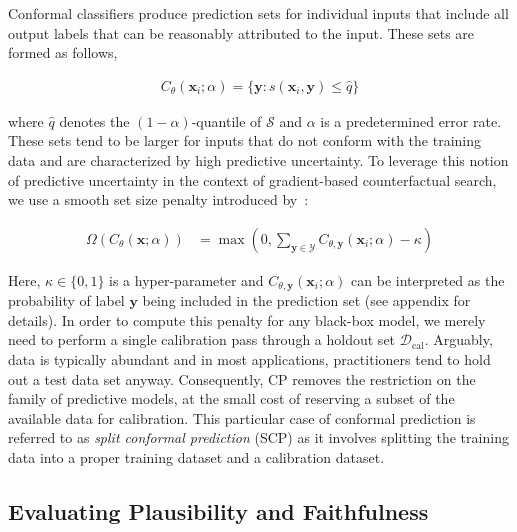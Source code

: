 \documentclass[letterpaper]{article} %
\begin{document}
Conformal classifiers produce prediction sets for individual inputs that include all output labels that can be reasonably attributed to the input. These sets are formed as follows,

\begin{equation}\label{eq:scp}
  \begin{aligned}
    C_{\theta}(\mathbf{x}_i;\alpha)=\{\mathbf{y}: s(\mathbf{x}_i,\mathbf{y}) \le \hat{q}\}
  \end{aligned}
\end{equation}

where $\hat{q}$ denotes the $(1-\alpha)$-quantile of $\mathcal{S}$ and $\alpha$ is a predetermined error rate. These sets tend to be larger for inputs that do not conform with the training data and are characterized by high predictive uncertainty. To leverage this notion of predictive uncertainty in the context of gradient-based counterfactual search, we use a smooth set size penalty introduced by~\citet{stutz2022learning}:

\begin{equation}\label{eq:setsize}
  \begin{aligned}
    \Omega(C_{\theta}(\mathbf{x};\alpha))&=\max \left(0, \sum_{\mathbf{y}\in\mathcal{Y}}C_{\theta,\mathbf{y}}(\mathbf{x}_i;\alpha) - \kappa \right)
  \end{aligned}
\end{equation}

Here, $\kappa \in \{0,1\}$ is a hyper-parameter and $C_{\theta,\mathbf{y}}(\mathbf{x}_i;\alpha)$ can be interpreted as the probability of label $\mathbf{y}$ being included in the prediction set (see appendix for details). In order to compute this penalty for any black-box model, we merely need to perform a single calibration pass through a holdout set $\mathcal{D}_{\text{cal}}$. Arguably, data is typically abundant and in most applications, practitioners tend to hold out a test data set anyway. Consequently, CP removes the restriction on the family of predictive models, at the small cost of reserving a subset of the available data for calibration. This particular case of conformal prediction is referred to as \textit{split conformal prediction} (SCP) as it involves splitting the training data into a proper training dataset and a calibration dataset.

\subsection{Evaluating Plausibility and Faithfulness}
\end{document}
